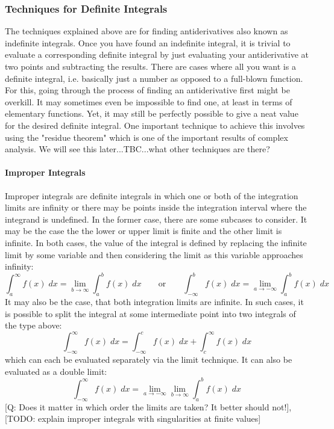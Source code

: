 
\subsubsection{Techniques for Definite Integrals}
The techniques explained above are for finding antiderivatives also known as indefinite integrals. Once you have found an indefinite integral, it is trivial to evaluate a corresponding definite integral by just evaluating your antiderivative at two points and subtracting the results. There are cases where all you want is a definite integral, i.e. basically just a number as opposed to a full-blown function. For this, going through the process of finding an antiderivative first might be overkill. It may sometimes even be impossible to find one, at least in terms of elementary functions. Yet, it may still be perfectly possible to give a neat value for the desired definite integral. One important technique to achieve this involves using the "residue theorem" which is one of the important results of complex analysis. We will see this later...TBC...what other techniques are there?


\paragraph{Improper Integrals}
Improper integrals are definite integrals in which one or both of the integration limits are infinity or there may be points inside the integration interval where the integrand is undefined. In the former case, there are some subcases to consider. It may be the case the the lower or upper limit is finite and the other limit is infinite. In both cases, the value of the integral is defined by replacing the infinite limit by some variable and then considering the limit as this variable approaches infinity:
\begin{equation}
\int_a^{\infty} f(x) \; dx = \lim_{b \rightarrow \infty} \int_a^b f(x) \; dx
\qquad \text{or} \qquad
\int_{-\infty}^b f(x) \; dx = \lim_{a \rightarrow -\infty} \int_a^b f(x) \; dx
\end{equation}
It may also be the case, that both integration limits are infinite. In such cases, it is possible to split the integral at some intermediate point into two integrals of the type above:
\begin{equation}
\int_{-\infty}^{\infty} f(x) \; dx = \int_{-\infty}^c f(x) \; dx + \int_c^{\infty} f(x) \; dx
\end{equation}
which can each be evaluated separately via the limit technique. It can also be evaluated as a double limit:
\begin{equation}
\int_{-\infty}^{\infty} f(x) \; dx = \lim_{a \rightarrow -\infty} \lim_{b \rightarrow \infty} \int_a^b f(x) \; dx
\end{equation}
[Q: Does it matter in which order the limits are taken? It better should not!], [TODO: explain improper integrals with singularities at finite values]


